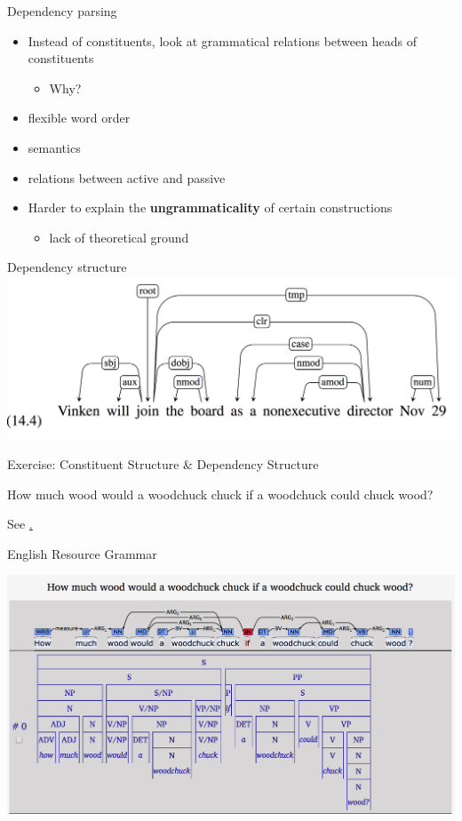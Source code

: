 \documentclass{beamer}
\begin{document}
\begin{frame}{Dependency parsing}

  \begin{itemize}
  \item Instead of constituents, look at grammatical relations between heads of constituents
    \begin{itemize}
    \item Why?
    \end{itemize}
  \item flexible word order
  \item semantics
  \item relations between active and passive
  \item Harder to explain the {\bf ungrammaticality} of certain constructions
    \begin{itemize}
    \item lack of theoretical ground
    \end{itemize}
  \end{itemize}
\end{frame}

\begin{frame}{Dependency structure}
  \includegraphics[width=\textwidth]{figures/dep1}
\end{frame}


\begin{frame}{Exercise: Constituent Structure \& Dependency Structure}

  How much wood would a woodchuck chuck if a woodchuck could chuck
  wood?

  See \href{https://youtu.be/pF0RgB1dZTU}.
\end{frame}

\begin{frame}{English Resource Grammar}

  \includegraphics[width=\textwidth]{figures/woodchuck}

\end{frame}
\end{document}
